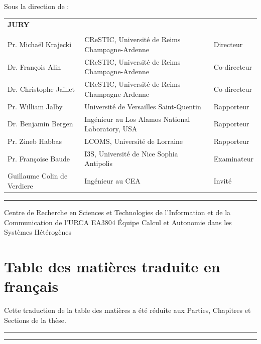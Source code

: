 \documentclass[12pt,a4paper]{report}
\begin{document}
{%
{
	Sous la direction de :\\ 
	\textbf{\phdDirector}
	\vspace{0.5cm}
}

{
\normalsize
\begin{tabular}{l l l}
		\textbf{JURY} &  & \\
		&&\\
		Pr. Michaël Krajecki & CReSTIC, Université de Reims Champagne-Ardenne & Directeur \\
		Dr. François Alin & CReSTIC, Université de Reims Champagne-Ardenne & Co-directeur  \\
		Dr. Christophe Jaillet & CReSTIC, Université de Reims Champagne-Ardenne & Co-directeur \\
		Pr. William Jalby & Université de Versailles Saint-Quentin & Rapporteur\\
		Dr. Benjamin Bergen & Ingénieur au Los Alamos National Laboratory, USA & Rapporteur \\
		Pr. Zineb Habbas & LCOMS, Université de Lorraine & Rapporteur \\ 
		Pr. Françoise Baude & I3S, Université de Nice Sophia Antipolis& Examinateur\\
		Guillaume Colin de Verdiere & Ingénieur au CEA & Invit\'e
\end{tabular}
\vspace{0.5cm}
\hrule
\vspace{0.3cm}
}

{
	Centre de Recherche en Sciences et Technologies de l'Information et de la Communication de l'URCA EA3804
}
{
	\'Equipe Calcul et Autonomie dans les Systèmes Hétérogènes
}

}

\clearpage 
{}



\section*{Table des matières traduite en français}
Cette traduction de la table des matières a été réduite aux Parties, Chapitres et Sections de la thèse. 
\vspace{.2cm}
\hrule
\makeatletter

\makeatother
\vspace{.2cm}
\hrule
\end{document}
